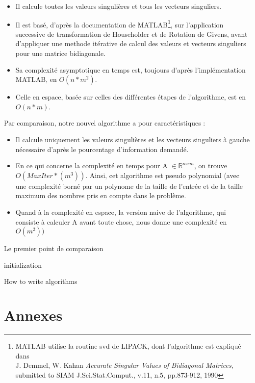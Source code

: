 \documentclass[a4paper,12pt]{article}
\begin{document}
        \begin{itemize}
            \item Il calcule toutes les valeurs singulières et tous les vecteurs singuliers.
            \item Il est basé, d'après la documentation de MATLAB\footnote{MATLAB utilise la routine svd de LIPACK, dont l'algorithme est expliqué dans \\    J. Demmel, W. Kahan \textit{Accurate Singular Values of Bidiagonal Matrices}, submitted to SIAM J.Sci.Stat.Comput., v.11, n.5, pp.873-912, 1990}, sur l'application successive de transformation de Householder et de Rotation de Givens, avant d'appliquer une methode itérative de calcul des valeurs et vecteurs singuliers pour une matrice bidiagonale.
            \item Sa complexité asymptotique en temps est, toujours d'après l'implémentation MATLAB, en $O(n*m^2)$.
            \item Celle en espace, basée sur celles des différentes étapes de l'algorithme, est en $O(n*m)$.
        \end{itemize}
\bigskip
    Par comparaison, notre nouvel algorithme a pour caractéristiques : \\

        \begin{itemize}
            \item Il calcule uniquement les valeurs singulières et les vecteurs singuliers à gauche nécessaire d'après le pourcentage d'information demandé.
            \item En ce qui concerne la complexité en temps pour A $\in \mathbb{R}^{mxm}$, on trouve $O(MaxIter*(m^3))$. Ainsi, cet algorithme est pseudo polynomial (avec une complexité borné par un polynome de la taille de l'entrée et de la taille maximum des nombres pris en compte dans le problème.
            \item Quand à la complexité en espace, la version naive de l'algorithme, qui consiste à calculer A avant toute chose, nous donne une complexité en $O(m^2))$
        \end{itemize}
\bigskip
    Le premier point de comparaison



\begin{algorithm}[H]  %
  \DontPrintSemicolon %
  initialization\;    %
  \BlankLine          %
  \caption{How to write algorithms} %
\end{algorithm}

\newpage
\section*{Annexes}

\listofalgorithms
\end{document}
